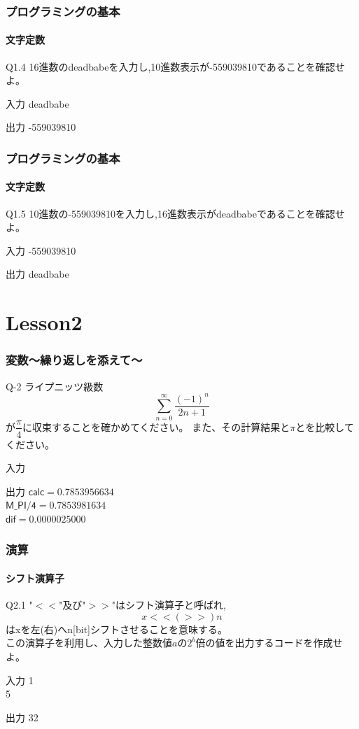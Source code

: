\documentclass[dvipdfmx]{beamer}
\begin{document}
\begin{frame}
    \frametitle{プログラミングの基本}
    \framesubtitle{文字定数}
	\begin{itembox}[l]{Q1.4}
        16進数のdeadbabeを入力し,10進数表示が-559039810であることを確認せよ。
	\end{itembox}
	\begin{block}{入力}
        deadbabe
	\end{block}
	\begin{block}{出力}
        -559039810
	\end{block}
\end{frame}

\begin{frame}
    \frametitle{プログラミングの基本}
    \framesubtitle{文字定数}
	\begin{itembox}[l]{Q1.5}
        10進数の-559039810を入力し,16進数表示がdeadbabeであることを確認せよ。
	\end{itembox}
	\begin{block}{入力}
        -559039810
	\end{block}
	\begin{block}{出力}
        deadbabe
	\end{block}
\end{frame}

\section{Lesson2}
\begin{frame}
	\frametitle{変数～繰り返しを添えて～}
	\begin{itembox}[l]{Q-2}
		ライプニッツ級数
		$$\sum_{n=0}^{\infty}\frac{(-1)^n}{2n+1}$$
		が$\dfrac{\pi}{4}$に収束することを確かめてください。
		また、その計算結果と$\pi$とを比較してください。
	\end{itembox}
	\begin{block}{入力}
	\end{block}
	\begin{block}{出力}
		$\mathsf{calc = 0.7853956634}$\\
		$\mathsf{M\_PI/4 = 0.7853981634}$\\
		$\mathsf{dif = 0.0000025000}$
	\end{block}
\end{frame}

\begin{frame}
    \frametitle{演算}
    \framesubtitle{シフト演算子}
	\begin{itembox}[l]{Q2.1}
        "$<<$"及び"$>>$"はシフト演算子と呼ばれ,
        $$x <<(>>) n$$
        はxを左(右)へn[bit]シフトさせることを意味する。\\
        この演算子を利用し、入力した整数値$a$の$2^b$倍の値を出力するコードを作成せよ。
	\end{itembox}
	\begin{block}{入力}
        1\\
        5
	\end{block}
	\begin{block}{出力}
        32
	\end{block}
\end{frame}
\end{document}
